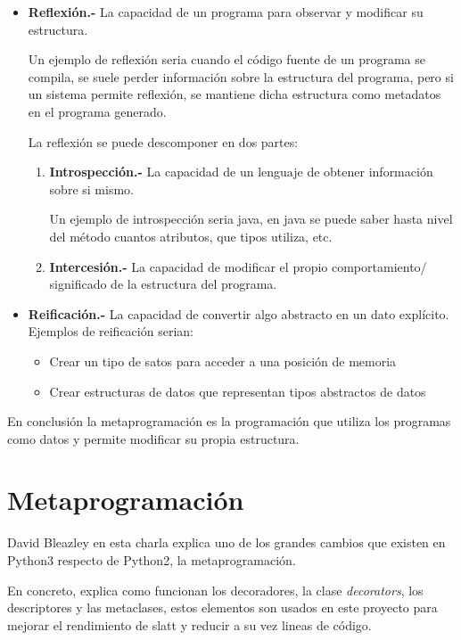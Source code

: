 \documentclass{cosas/tfg_domingo}
\begin{document}
\begin{itemize}
    \item \textbf{Reflexión.- } La capacidad de un programa para observar y modificar su estructura.
    
    Un ejemplo de reflexión seria cuando el código fuente de un programa se compila, se suele perder información sobre la estructura del programa, pero si un sistema permite reflexión, se mantiene dicha estructura como metadatos en el programa generado.
    
    La reflexión se puede descomponer en dos partes:
    
    \begin{enumerate}
        \item \textbf{Introspección.- } La capacidad de un lenguaje de obtener información sobre si mismo.
        
        Un ejemplo de introspección seria java, en java se puede saber hasta nivel del método cuantos atributos, que tipos utiliza, etc.
        \item \textbf{Intercesión.- } La capacidad de modificar el propio comportamiento/ significado de la estructura del programa.
    \end{enumerate}
    
    \item \textbf{Reificación.- } La capacidad de convertir algo abstracto en un dato explícito.
    Ejemplos de reificación serian:
    \begin{itemize}
        \item Crear un tipo de satos para acceder a una posición de memoria
        \item Crear estructuras de datos que representan tipos abstractos de datos
    \end{itemize}
\end{itemize}

En conclusión la metaprogramación es la programación que utiliza los programas como datos y permite modificar su propia estructura. \citep{silva2018metaprogramacion}

\section{Metaprogramación}

David Bleazley en esta charla explica uno de los grandes cambios que existen en Python3 respecto de Python2, la metaprogramación.\citep{David}

En concreto, explica como funcionan los decoradores, la clase \textit{decorators}, los descriptores y las metaclases, estos elementos son usados en este proyecto para mejorar el rendimiento de slatt y reducir a su vez lineas de código.
\end{document}
